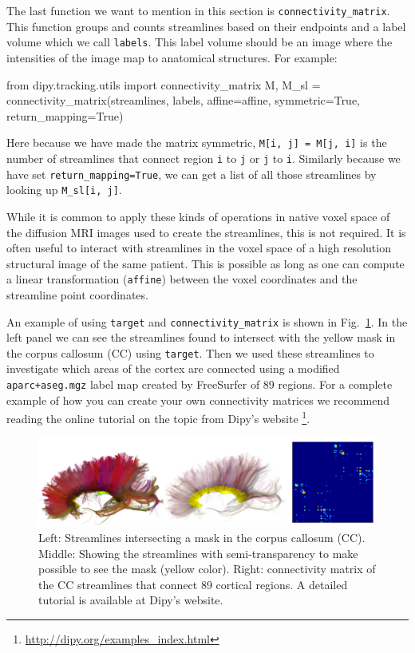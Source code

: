 \documentclass{bioinfo}
\begin{document}
The last function we want to mention in this section is
\texttt{connectivity\_matrix}. This function groups and counts streamlines
based on their endpoints and a label volume which we call \texttt{labels}. This
label volume should be an image where the intensities of the image map to
anatomical structures. For example:

\begin{python}
from dipy.tracking.utils import
                              connectivity_matrix
M, M_sl = connectivity_matrix(streamlines, labels,
                              affine=affine,
                              symmetric=True,
                              return_mapping=True)
\end{python}

Here because we have made the matrix symmetric, \texttt{M[i, j] = M[j, i]} is the number of streamlines that connect region \texttt{i} to \texttt{j}
or \texttt{j} to \texttt{i}. Similarly because we have set
\texttt{return\_mapping=True}, we can get a list of all those streamlines by
looking up \texttt{M\_sl[i, j]}.

While it is common to apply these kinds of operations in native voxel space of
the diffusion MRI images used to create the streamlines, this is not
required. It is often useful to interact with streamlines in the voxel space of
a high resolution structural image of the same patient. This is possible as
long as one can compute a linear transformation (\texttt{affine}) between the voxel coordinates and the streamline point coordinates.

An example of using \texttt{target} and \texttt{connectivity\_matrix} is shown in Fig.~\ref{Fig:connectivity}. In the left panel we can see the streamlines found to intersect with the yellow mask in the corpus callosum (CC) using \texttt{target}. Then we used these streamlines to investigate which areas of
the cortex are connected using a modified  \texttt{aparc+aseg.mgz} label map created by FreeSurfer \citep{fischl-freesurfer:12} of 89 regions. For a complete example of how you can create your own connectivity matrices we recommend reading the online tutorial on the topic from Dipy's website \footnote{\url{http://dipy.org/examples\_index.html}}.

\begin{figure}[!htb]
\includegraphics[scale=0.9]{Figures/connectivity_cc.jpg}
\centering{}
\caption{Left: Streamlines intersecting a mask in the corpus callosum (CC).
  Middle: Showing the streamlines with semi-transparency to make possible to see the mask (yellow color). Right: connectivity matrix of the CC streamlines that connect 89 cortical regions. A detailed tutorial is available at Dipy's website. \label{Fig:connectivity}}
\end{figure}
\end{document}
